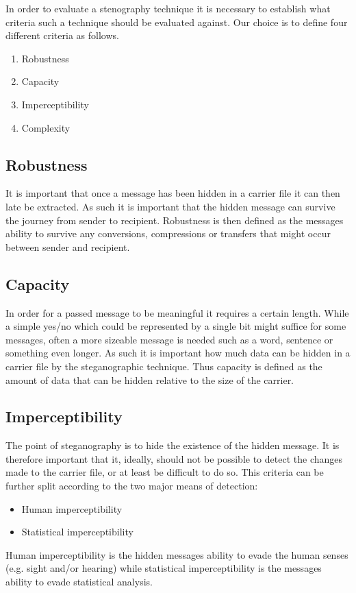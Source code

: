 In order to evaluate a stenography technique it is necessary to establish what criteria such a technique should be evaluated against. Our choice is to define four different criteria as follows.
\begin{enumerate}
\item Robustness
\item Capacity
\item Imperceptibility
\item Complexity
\end{enumerate}

\subsection{Robustness}
It is important that once a message has been hidden in a carrier file it can then late be extracted. As such it is important that the hidden message can survive the journey from sender to recipient. Robustness is then defined as the messages ability to survive any conversions, compressions or transfers that might occur between sender and recipient.

\subsection{Capacity}
In order for a passed message to be meaningful it requires a certain length. While a simple yes/no which could be represented by a single bit might suffice for some messages, often a more sizeable message is needed such as a word, sentence or something even longer. As such it is important how much data can be hidden in a carrier file by the steganographic technique. Thus capacity is defined as the amount of data that can be hidden relative to the size of the carrier.

\subsection{Imperceptibility}
The point of steganography is to hide the existence of the hidden message. It is therefore important that it, ideally, should not be possible to detect the changes made to the carrier file, or at least be difficult to do so. This criteria can be further split according to the two major means of detection:
\begin{itemize}
\item Human imperceptibility
\item Statistical imperceptibility
\end{itemize}
Human imperceptibility is the hidden messages ability to evade the human senses (e.g. sight and/or hearing) while statistical imperceptibility is the messages ability to evade statistical analysis. 

